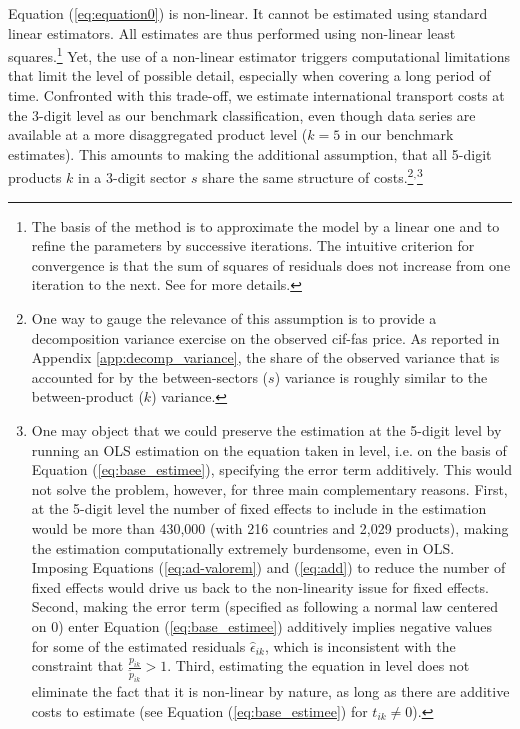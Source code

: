 \documentclass[a4paper,11pt]{article}
\begin{document}
Equation (\ref{eq:equation0}) is non-linear. It cannot be estimated using standard linear estimators.
All estimates are thus performed using non-linear least squares.\footnote{The basis of the method is to approximate the model by a linear one and to refine the parameters by successive iterations.
The intuitive criterion for convergence is that the sum of squares of residuals does not increase from one iteration to the next.
See \cite{Woolridge-Book-2001} for more details.} Yet, the use of a non-linear estimator triggers computational limitations that limit the level of possible detail, especially when covering a long period of time.
Confronted with this trade-off, we estimate international transport costs at the 3-digit level as our benchmark classification, even though data series are available at a more disaggregated product level ($k=5$ in our benchmark estimates). This amounts to making the additional assumption, that all 5-digit products $k$ in a 3-digit sector $s$ share the
same structure of costs.\footnote{One way to gauge the relevance of this assumption is to provide a decomposition variance exercise on the observed cif-fas price.
As reported in Appendix \ref{app:decomp_variance}, the share of the observed variance that is accounted for by the between-sectors ($s$) variance is roughly similar to the between-product ($k$) variance.}$^{,}$\footnote{One may object that we could preserve the estimation at the 5-digit level by running an OLS estimation on the equation taken in level, i.e.
on the basis of Equation (\ref{eq:base_estimee}), specifying the error term additively.
This would not solve the problem, however, for three main complementary reasons.
First, at the 5-digit level the number of fixed effects to include in the estimation would be more than 430,000 (with 216 countries and 2,029 products), making the estimation computationally extremely burdensome, even in OLS.
Imposing Equations (\ref{eq:ad-valorem}) and (\ref{eq:add}) to reduce the number of fixed effects would drive us back to the non-linearity issue for fixed effects.
Second, making the error term (specified as following a normal law centered on 0) enter Equation (\ref{eq:base_estimee}) additively implies negative values for some of the estimated residuals $\widehat{\epsilon}_{ik}$, which is inconsistent with the constraint that $\frac{p_{ik}}{\widetilde{p}_{ik}}>1$.
Third, estimating the equation in level does not eliminate the fact that it is non-linear by nature, as long as there are additive costs to estimate (see Equation (\ref{eq:base_estimee}) for $t_{ik} \neq 0$).}
\end{document}
